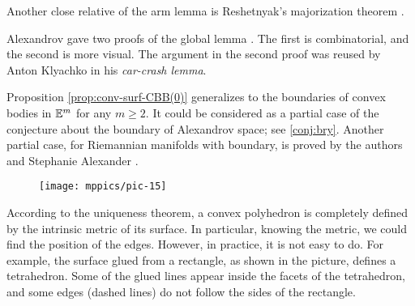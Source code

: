 Another close relative of the arm lemma is Reshetnyak's majorization theorem \cite{reshetnyak}.

Alexandrov gave two proofs of the global lemma \cite[2.1.2 and 2.1.3]{alexandrov}.
The first is combinatorial, and the second is more visual.
The argument in the second proof was reused by Anton Klyachko \cite{klyachko} in his \emph{car-crash lemma}.

Proposition \ref{prop:conv-surf-CBB(0)} generalizes to the boundaries of convex bodies  in $\mathbb{E}^m$ for any $m\ge 2$.
It could be considered as a partial case of the conjecture about the boundary of Alexandrov space; see \ref{conj:bry}.
Another partial case, for Riemannian manifolds with boundary, is proved by the authors and Stephanie Alexander \cite{alexander-kapovitch-petrunin-2008}.


\begin{wrapfigure}{r}{30mm}
\vskip-3mm
\centering
\texttt{[image: mppics/pic-15]}
\vskip-0mm
\end{wrapfigure}

According to the uniqueness theorem, a convex polyhedron is completely defined by the intrinsic metric of its surface.
In particular, knowing the metric, we could find the position of the edges.
However, in practice, it is not easy to do.
For example, the surface glued from a rectangle, as shown in the picture, defines a tetrahedron.
Some of the glued lines appear inside the facets of the tetrahedron, and some edges (dashed lines) do not follow the sides of the rectangle.

